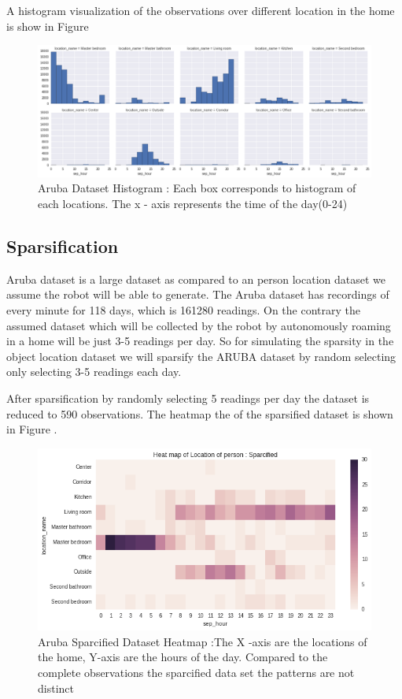 \documentclass[11pt]{report}
\begin{document}
A histogram visualization of the observations over different location in the home is show in Figure \cite{aruba-hist}

\begin{figure}[htp]
\centering
\includegraphics[width=\textwidth]{images/aruba-hist.png}
\caption{Aruba Dataset Histogram : Each box corresponds to histogram of each locations. The x - axis represents the time of the day(0-24) }
\label{aruba-hist}
\end{figure}


\subsection*{Sparsification}
Aruba dataset is a large dataset as compared to an person location dataset we assume the robot will be able to generate. The Aruba dataset has recordings of every minute for 118 days, which is 161280 readings.
On the contrary the assumed dataset which will be collected by the robot by autonomously roaming in a home will be just 3-5 readings per day.
So for simulating the sparsity in the object location dataset we will sparsify the ARUBA dataset by random selecting only selecting 3-5 readings each day.

After sparsification by randomly selecting 5 readings per day the dataset is reduced to 590 observations. The heatmap the of the sparsified dataset is shown in Figure \cite{aruba-reduced-hist}. 

\begin{figure}[htp]
\centering
\includegraphics[width=\textwidth]{images/aruba-reduced-heatmap.png}
\caption{Aruba Sparcified Dataset Heatmap :The X -axis are the locations of the home, Y-axis are the hours of the day. Compared to the complete observations the sparcified data set the patterns are not distinct}
\label{aruba-reduced-hist}
\end{figure}
\end{document}
